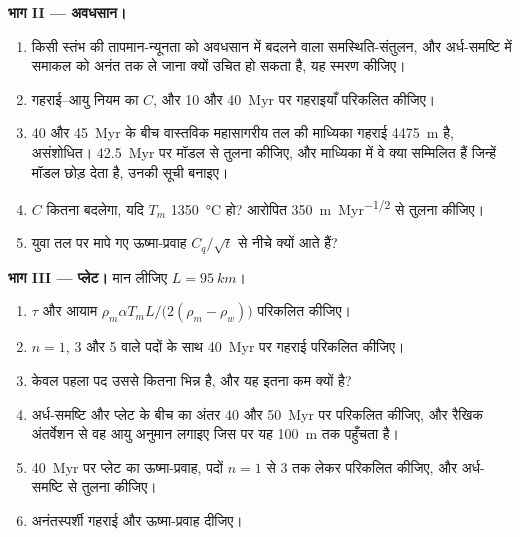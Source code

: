 \begin{problem}
\medskip\noindent\textbf{भाग II --- अवधसान।}
\begin{enumerate}[resume]
  \item किसी स्तंभ की तापमान-न्यूनता को अवधसान में बदलने वाला समस्थिति-संतुलन,
        और अर्ध-समष्टि में समाकल को अनंत तक ले जाना क्यों उचित हो सकता है,
        यह स्मरण कीजिए।
  \item गहराई–आयु नियम का $C$, और 10 और
        \qty{40}{Myr} पर गहराइयाँ परिकलित कीजिए।
  \item 40 और \qty{45}{Myr} के बीच वास्तविक महासागरीय तल की माध्यिका गहराई
        \qty{4475}{m} है, असंशोधित।
        \qty{42.5}{Myr} पर मॉडल से तुलना कीजिए, और
        माध्यिका में वे क्या सम्मिलित हैं जिन्हें मॉडल छोड़ देता है, उनकी सूची बनाइए।
  \item $C$ कितना बदलेगा, यदि $T_m$ \qty{1350}{\celsius} हो?
        आरोपित \qty{350}{m.Myr^{-1/2}} से तुलना कीजिए।
  \item युवा तल पर मापे गए ऊष्मा-प्रवाह $C_q/\sqrt t$ से नीचे क्यों आते हैं?
\end{enumerate}

\medskip\noindent\textbf{भाग III --- प्लेट।} मान लीजिए $L = \qty{95}{km}$।
\begin{enumerate}[resume]
  \item $\tau$ और आयाम $\rho_m\alpha T_mL/\bigl(2(\rho_m -
        \rho_w)\bigr)$ परिकलित कीजिए।
  \item $n = 1$, 3 और 5 वाले पदों के साथ \qty{40}{Myr} पर गहराई परिकलित कीजिए।
  \item केवल पहला पद उससे कितना भिन्न है, और
        यह इतना कम क्यों है?
  \item अर्ध-समष्टि और प्लेट के बीच का अंतर 40 और
        \qty{50}{Myr} पर परिकलित कीजिए, और रैखिक अंतर्वेशन से वह आयु
        अनुमान लगाइए जिस पर यह \qty{100}{m} तक पहुँचता है।
  \item \qty{40}{Myr} पर प्लेट का ऊष्मा-प्रवाह, पदों
        $n = 1$ से 3 तक लेकर परिकलित कीजिए, और अर्ध-समष्टि से तुलना कीजिए।
  \item अनंतस्पर्शी गहराई और ऊष्मा-प्रवाह दीजिए।
\end{enumerate}


\end{problem}
